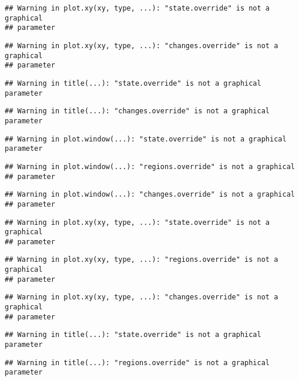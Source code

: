 \documentclass[]{book}
\theoremstyle{definition}
\theoremstyle{definition}
\theoremstyle{definition}
\theoremstyle{remark}
\begin{document}
\begin{verbatim}
## Warning in plot.xy(xy, type, ...): "state.override" is not a graphical
## parameter
\end{verbatim}

\begin{verbatim}
## Warning in plot.xy(xy, type, ...): "changes.override" is not a graphical
## parameter
\end{verbatim}

\begin{verbatim}
## Warning in title(...): "state.override" is not a graphical parameter
\end{verbatim}

\begin{verbatim}
## Warning in title(...): "changes.override" is not a graphical parameter
\end{verbatim}

\begin{verbatim}
## Warning in plot.window(...): "state.override" is not a graphical parameter
\end{verbatim}

\begin{verbatim}
## Warning in plot.window(...): "regions.override" is not a graphical
## parameter
\end{verbatim}

\begin{verbatim}
## Warning in plot.window(...): "changes.override" is not a graphical
## parameter
\end{verbatim}

\begin{verbatim}
## Warning in plot.xy(xy, type, ...): "state.override" is not a graphical
## parameter
\end{verbatim}

\begin{verbatim}
## Warning in plot.xy(xy, type, ...): "regions.override" is not a graphical
## parameter
\end{verbatim}

\begin{verbatim}
## Warning in plot.xy(xy, type, ...): "changes.override" is not a graphical
## parameter
\end{verbatim}

\begin{verbatim}
## Warning in title(...): "state.override" is not a graphical parameter
\end{verbatim}

\begin{verbatim}
## Warning in title(...): "regions.override" is not a graphical parameter
\end{verbatim}
\end{document}
